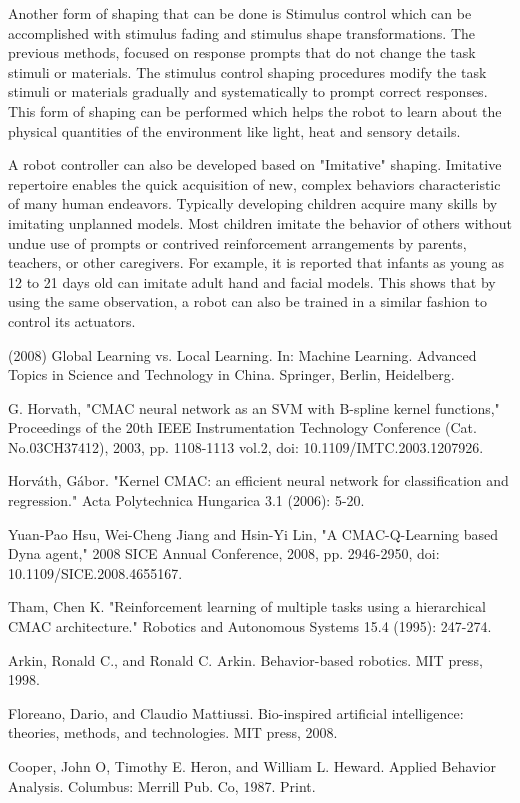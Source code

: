 \documentclass[a4paper, 10pt]{article}
\begin{document}
Another form of shaping that can be done is Stimulus control which can be accomplished with stimulus fading and stimulus shape transformations. The previous methods, focused on response prompts that do not change the task stimuli or materials. The stimulus control shaping procedures modify the task stimuli or materials gradually and systematically to prompt correct responses. This form of shaping can be performed which helps the robot to learn about the physical quantities of the environment like light, heat and sensory details. 

A robot controller can also be developed based on "Imitative" shaping. Imitative repertoire enables the quick acquisition of new, complex behaviors characteristic of many human endeavors. Typically developing children acquire many skills by imitating unplanned models. Most children imitate the behavior of others without undue use of prompts or contrived reinforcement arrangements by parents, teachers, or other caregivers. For example, it is reported that infants as young as 12 to 21 days old can imitate adult hand and facial models. This shows that by using the same observation, a robot can also be trained in a similar fashion to control its actuators.



\begin{thebibliography}{9}
	(2008) Global Learning vs. Local Learning. In: Machine Learning. Advanced Topics in Science and Technology in China. Springer, Berlin, Heidelberg. 
	
	G. Horvath, "CMAC neural network as an SVM with B-spline kernel functions," Proceedings of the 20th IEEE Instrumentation Technology Conference (Cat. No.03CH37412), 2003, pp. 1108-1113 vol.2, doi: 10.1109/IMTC.2003.1207926.

	Horváth, Gábor. "Kernel CMAC: an efficient neural network for classification and regression." Acta Polytechnica Hungarica 3.1 (2006): 5-20.
	
	Yuan-Pao Hsu, Wei-Cheng Jiang and Hsin-Yi Lin, "A CMAC-Q-Learning based Dyna agent," 2008 SICE Annual Conference, 2008, pp. 2946-2950, doi: 10.1109/SICE.2008.4655167.
	
	Tham, Chen K. "Reinforcement learning of multiple tasks using a hierarchical CMAC architecture." Robotics and Autonomous Systems 15.4 (1995): 247-274.
	
	Arkin, Ronald C., and Ronald C. Arkin. Behavior-based robotics. MIT press, 1998.
	
	Floreano, Dario, and Claudio Mattiussi. Bio-inspired artificial intelligence: theories, methods, and technologies. MIT press, 2008.
	
	Cooper, John O, Timothy E. Heron, and William L. Heward. Applied Behavior Analysis. Columbus: Merrill Pub. Co, 1987. Print.
	
\end{thebibliography}
\end{document}
